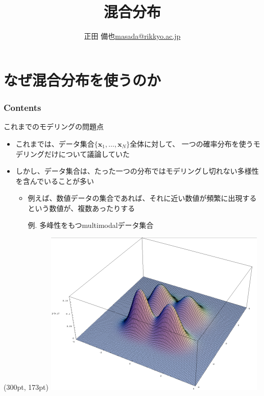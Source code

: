 \documentclass[aspectratio=169,unicode,dvipdfmx,14pt]{beamer}
\title{ \\混合分布}
\author{\texorpdfstring{正田 備也\newline\href{mailto:masada@rikkyo.ac.jp}{masada@rikkyo.ac.jp}}{正田 備也}}
\date{}
\begin{document}
\begin{frame}
\titlepage
\end{frame}

\section{なぜ混合分布を使うのか}

\begin{frame}\frametitle{Contents}
\Large \tableofcontents[currentsection]
\end{frame}

\begin{frame}{これまでのモデリングの問題点}
\begin{itemize}
\item これまでは、データ集合$\{\bm{x}_1, \ldots, \bm{x}_N\}$全体に対して、
一つの確率分布を使うモデリングだけについて議論していた
\item しかし、データ集合は、たった一つの分布ではモデリングし切れない多様性を含んでいることが多い
\begin{itemize}
\item 例えば、数値データの集合であれば、それに近い数値が頻繁に出現するという数値が、複数あったりする
\item[例.] 多峰性をもつmultimodalデータ集合
\end{itemize}
\end{itemize}
\begin{textblock*}{0.4\linewidth}(300pt, 173pt)
    \centering
    \includegraphics[width=0.7\linewidth]{Bimodal-bivariate-small.png}
\end{textblock*}

\end{frame}
\end{document}
